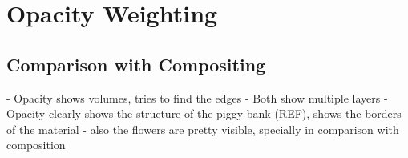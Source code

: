 

\section{Opacity Weighting}\label{sec:opacity}

\subsection{Comparison with Compositing}\label{subsec:opacity_compare}

- Opacity shows volumes, tries to find the edges
- Both show multiple layers
- Opacity clearly shows the structure of the piggy bank (REF), shows the borders of the material
- also the flowers are pretty visible, specially in comparison with composition



